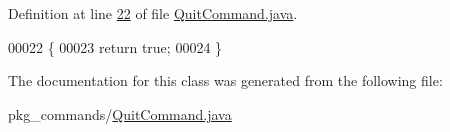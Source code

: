 Definition at line \hyperlink{QuitCommand_8java_source_l00022}{22} of file \hyperlink{QuitCommand_8java_source}{Quit\-Command.\-java}.


\begin{DoxyCode}
00022                                           \{
00023         \textcolor{keywordflow}{return} \textcolor{keyword}{true};
00024     \}
\end{DoxyCode}


The documentation for this class was generated from the following file\-:\begin{DoxyCompactItemize}
\item 
pkg\-\_\-commands/\hyperlink{QuitCommand_8java}{Quit\-Command.\-java}\end{DoxyCompactItemize}
